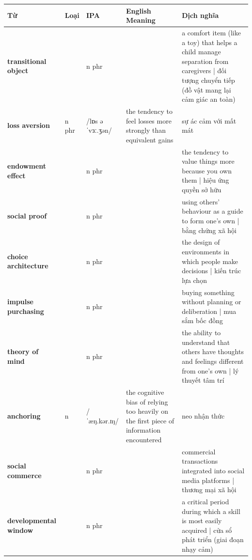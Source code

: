 \separator


\vspace{0.8em}
\begin{center}
\renewcommand{\arraystretch}{1.65}
\begin{tabularx}{\textwidth}{|V{0.22\textwidth}|C{0.07\textwidth}|I{0.20\textwidth}|Y|V{0.18\textwidth}|}
\hline
{}
\textbf{Từ} & \textbf{Loại} & \textbf{IPA} & \textbf{English Meaning} & \textbf{Dịch nghĩa} \\
\hline
\textbf{transitional object} & & n phr & & a comfort item (like a toy) that helps a child manage separation from caregivers | đối tượng chuyển tiếp (đồ vật mang lại cảm giác an toàn) \\ \hline
\textbf{loss aversion} & n phr & /lɒs əˈvɜː.ʒən/ & the tendency to feel losses more strongly than equivalent gains & sự ác cảm với mất mát \\ \hline
\textbf{endowment effect} & & n phr & & the tendency to value things more because you own them | hiệu ứng quyền sở hữu \\ \hline
\textbf{social proof} & & n phr & & using others' behaviour as a guide to form one's own | bằng chứng xã hội \\ \hline
\textbf{choice architecture} & & n phr & & the design of environments in which people make decisions | kiến trúc lựa chọn \\ \hline
\textbf{impulse purchasing} & & n phr & & buying something without planning or deliberation | mua sắm bốc đồng \\ \hline
\textbf{theory of mind} & & n phr & & the ability to understand that others have thoughts and feelings different from one's own | lý thuyết tâm trí \\ \hline
\textbf{anchoring} & n & /ˈæŋ.kər.ɪŋ/ & the cognitive bias of relying too heavily on the first piece of information encountered & neo nhận thức \\ \hline
\textbf{social commerce} & & n phr & & commercial transactions integrated into social media platforms | thương mại xã hội \\ \hline
\textbf{developmental window} & & n phr & & a critical period during which a skill is most easily acquired | cửa sổ phát triển (giai đoạn nhạy cảm) \\ \hline
\end{tabularx}
\end{center}

\newpage

